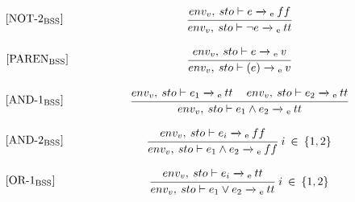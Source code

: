 \begin{equation}
\begin{minipage}{.2\linewidth}
$[\text{NOT-2}_\text{BSS}]$
\end{minipage}
\begin{minipage}{.8\linewidth}
\centering
$\cfrac{env_v, \: sto \vdash e \xrightarrow{}\textsubscript{e} \: ff}{env_v, \: sto \vdash \neg e \xrightarrow{}\textsubscript{e} \: tt}$
\end{minipage}
\end{equation}

\begin{equation}
\begin{minipage}{.2\linewidth}
$[\text{PAREN}_\text{BSS}]$
\end{minipage}
\begin{minipage}{.8\linewidth}
$\cfrac{env_v, \: sto \vdash e \xrightarrow{}\textsubscript{e} \: v}{env_v, \: sto \vdash (e) \xrightarrow{}\textsubscript{e} \: v}$
\centering
\end{minipage}
\end{equation}

\begin{equation}
\begin{minipage}{.2\linewidth}
$[\text{AND-1}_\text{BSS}]$
\end{minipage}
\begin{minipage}{.8\linewidth}
\centering
$\cfrac{env_v, \: sto \vdash e_1 \xrightarrow{}\textsubscript{e} \: tt \quad\: env_v, \: sto \vdash e_2 \xrightarrow{}\textsubscript{e} \: tt}{env_v, \: sto \vdash e_1 \wedge e_2 \xrightarrow{}\textsubscript{e} \: tt}$
\end{minipage}
\end{equation}

\begin{equation}
\begin{minipage}{.2\linewidth}
$[\text{AND-2}_\text{BSS}]$
\end{minipage}
\begin{minipage}{.8\linewidth}
\centering
$\cfrac{env_v, \: sto \vdash e_i \xrightarrow{}\textsubscript{e} \: ff }{env_v, \: sto \vdash e_1 \wedge e_2 \xrightarrow{}\textsubscript{e} \: ff}$
$i \: \in \: \{1,2\}$
\end{minipage}
\end{equation}

\begin{equation}
\begin{minipage}{.2\linewidth}
$[\text{OR-1}_\text{BSS}]$
\end{minipage}
\begin{minipage}{.8\linewidth}
\centering
$\cfrac{env_v, \: sto \vdash e_i \xrightarrow{}\textsubscript{e} \: tt }{env_v, \: sto \vdash e_1 \vee e_2 \xrightarrow{}\textsubscript{e} \: tt}$
$i \: \in \: \{1,2\}$
\end{minipage}
\end{equation}

